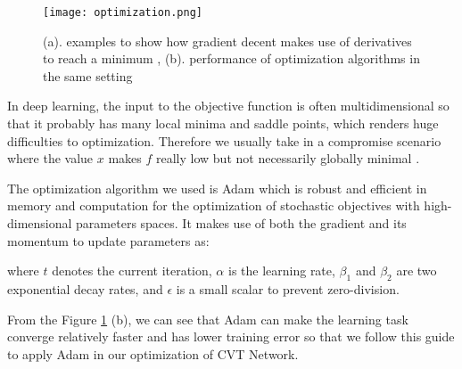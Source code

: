\begin{figure}[h]		
	\texttt{[image: optimization.png]}
	\caption{(a). examples to show how gradient decent makes use of derivatives to reach a minimum \cite{Goodfellow-et-al-2016}, (b). performance of optimization algorithms in the same setting \cite{DBLP:journals/corr/KingmaB14}}
	\centering
	\label{figure:optimization}
\end{figure}

In deep learning, the input to the objective function is often multidimensional so that it probably has many local minima and saddle points, which renders huge difficulties to optimization. Therefore we usually take in a compromise scenario where the value $x$ makes $f$ really low but not necessarily globally minimal \cite{Goodfellow-et-al-2016}.

The optimization algorithm we used is Adam \cite{DBLP:journals/corr/KingmaB14} which is robust and efficient in memory and computation for the optimization of stochastic objectives with high-dimensional parameters spaces. It makes use of both the gradient and its momentum to update parameters as: 

\begin{algorithm}[H]	
\end{algorithm}

where $ t $ denotes the current iteration, $\alpha$ is the learning rate, $\beta_1$ and $\beta_2$ are two exponential decay rates, and $\epsilon$ is a small scalar to prevent zero-division.

From the Figure \ref{figure:optimization} (b), we can see that Adam can make the learning task converge relatively faster and has lower training error so that we follow this guide to apply Adam in our optimization of CVT Network.
